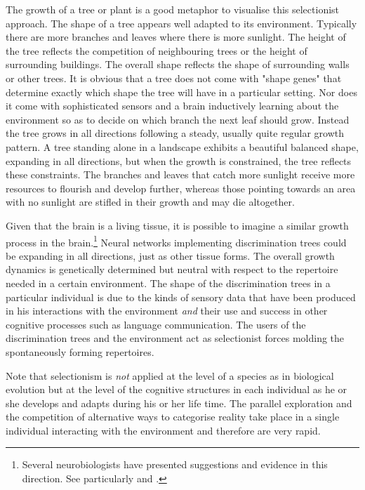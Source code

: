 The growth of a tree or plant is a good 
metaphor to visualise this selectionist approach. 
The shape of a tree appears well adapted to 
its environment. Typically there are more branches and leaves 
where there is more sunlight. The height of
the tree reflects the competition of neighbouring trees
or the height of surrounding buildings. The overall shape reflects
the shape of surrounding walls or other trees. 
It is obvious that a tree
does not come with "shape genes" that determine
exactly which shape the tree will have in a particular 
setting. Nor does it come with sophisticated sensors
and a brain inductively learning about the environment
so as to decide on which branch the next leaf should grow. 
Instead the tree grows in all directions following
a steady, usually quite regular growth pattern. A tree
standing alone in a landscape exhibits a beautiful 
balanced shape, expanding in all directions, but when the 
growth is constrained, the tree reflects these constraints. 
The branches and leaves that catch more sunlight receive more resources 
to flourish and develop further, whereas those 
pointing towards an area with no sunlight are stifled in 
their growth and may die altogether.  

Given that the brain is a living tissue, it is possible 
to imagine a similar growth process in the brain.\footnote{
Several neurobiologists have presented 
suggestions and evidence in this direction. See 
particularly \cite{Edelman:1987} and \cite{Changeux:1997}.}
Neural networks implementing discrimination trees could be expanding
in all directions, just as other
tissue forms. The overall growth dynamics is 
genetically determined but neutral with respect to 
the repertoire needed in a certain environment. 
The shape of the discrimination trees in a particular 
individual is due to the kinds of sensory 
data that have been produced in his interactions with
the environment {\itshape and} their use and success
in other cognitive processes such as language
communication. The
users of the discrimination trees and the environment act
as selectionist forces molding the spontaneously forming 
repertoires.

Note that selectionism is {\it not} applied at 
the level of a species as in biological evolution but 
at the level of the cognitive structures in each individual
as he or she develops and adapts during his or her life 
time. The parallel exploration and the competition of 
alternative ways to categorise reality take 
place in a single individual interacting with the environment
and therefore are very rapid.

